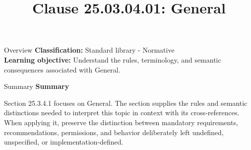 \documentclass[10pt,letterpaper]{article}
\title{Clause 25.03.04.01: General}
\author{}
\date{}
\begin{document}
\maketitle
\begin{CornellOverviewBox}{Overview}
\textbf{Classification:} Standard library - Normative\\[2pt]
\textbf{Learning objective:} Understand the rules, terminology, and semantic consequences associated with General.
\end{CornellOverviewBox}\begin{CornellSummaryBox}{Summary}
{\sffamily\bfseries\color{Accent} Summary}\par\vspace{3pt}Section 25.3.4.1 focuses on General. The section supplies the rules and semantic distinctions needed to interpret this topic in context with its cross-references. When applying it, preserve the distinction between mandatory requirements, recommendations, permissions, and behavior deliberately left undefined, unspecified, or implementation-defined.
\end{CornellSummaryBox}
\end{document}

